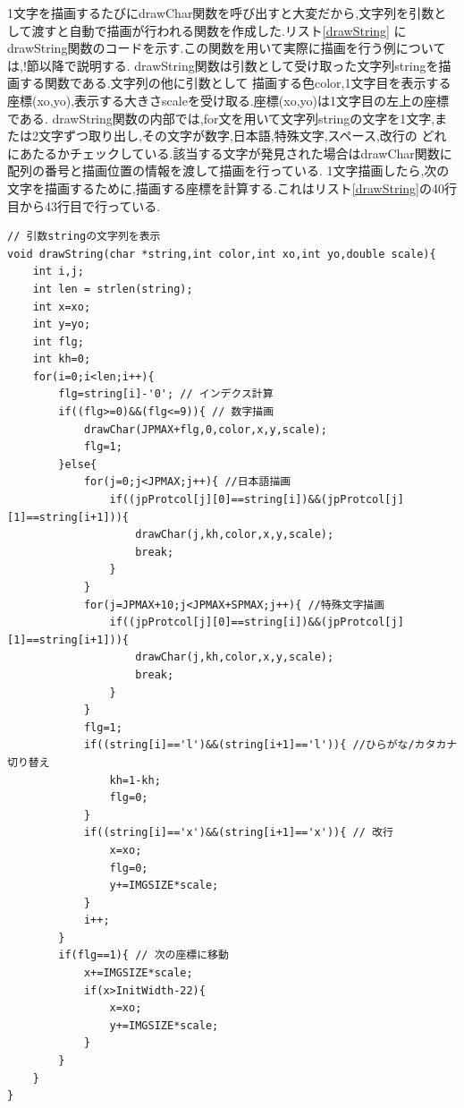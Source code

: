 \documentclass[a4j]{jarticle}
\begin{document}
    1文字を描画するたびにdrawChar関数を呼び出すと大変だから,文字列を引数として渡すと自動で描画が行われる関数を作成した.リスト\ref{drawString}
    にdrawString関数のコードを示す.この関数を用いて実際に描画を行う例については,!節以降で説明する.
    drawString関数は引数として受け取った文字列stringを描画する関数である.文字列の他に引数として
    描画する色color,1文字目を表示する座標(xo,yo),表示する大きさscaleを受け取る.座標(xo,yo)は1文字目の左上の座標である.
    drawString関数の内部では,for文を用いて文字列stringの文字を1文字,または2文字ずつ取り出し,その文字が数字,日本語,特殊文字,スペース,改行の
    どれにあたるかチェックしている.該当する文字が発見された場合はdrawChar関数に配列の番号と描画位置の情報を渡して描画を行っている.
    1文字描画したら,次の文字を描画するために,描画する座標を計算する.これはリスト\ref{drawString}の40行目から43行目で行っている.
    \begin{lstlisting}[basicstyle=\ttfamily\footnotesize, frame=single,label=drawString,caption=drawString関数]
// 引数stringの文字列を表示
void drawString(char *string,int color,int xo,int yo,double scale){
    int i,j;
    int len = strlen(string);
    int x=xo;
    int y=yo;
    int flg;
    int kh=0;
    for(i=0;i<len;i++){
        flg=string[i]-'0'; // インデクス計算
        if((flg>=0)&&(flg<=9)){ // 数字描画
            drawChar(JPMAX+flg,0,color,x,y,scale);
            flg=1;
        }else{
            for(j=0;j<JPMAX;j++){ //日本語描画
                if((jpProtcol[j][0]==string[i])&&(jpProtcol[j][1]==string[i+1])){
                    drawChar(j,kh,color,x,y,scale);
                    break;
                }
            }       
            for(j=JPMAX+10;j<JPMAX+SPMAX;j++){ //特殊文字描画
                if((jpProtcol[j][0]==string[i])&&(jpProtcol[j][1]==string[i+1])){
                    drawChar(j,kh,color,x,y,scale);
                    break;
                }
            }
            flg=1;
            if((string[i]=='l')&&(string[i+1]=='l')){ //ひらがな/カタカナ切り替え
                kh=1-kh;
                flg=0;
            }
            if((string[i]=='x')&&(string[i+1]=='x')){ // 改行
                x=xo;
                flg=0;
                y+=IMGSIZE*scale;
            }     
            i++;
        }
        if(flg==1){ // 次の座標に移動
            x+=IMGSIZE*scale;
            if(x>InitWidth-22){
                x=xo;
                y+=IMGSIZE*scale;
            }
        }
    }
}
    \end{lstlisting}
\end{document}

